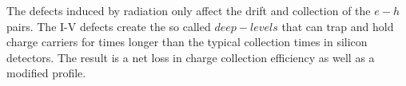 


The defects induced by radiation only affect the drift and collection of the $e-h$ pairs. The I-V defects create the so called $deep-levels$ that can trap and hold charge carriers for times longer than the typical collection times in silicon detectors. The result is a net loss in charge collection efficiency as well as a modified \neff profile.

